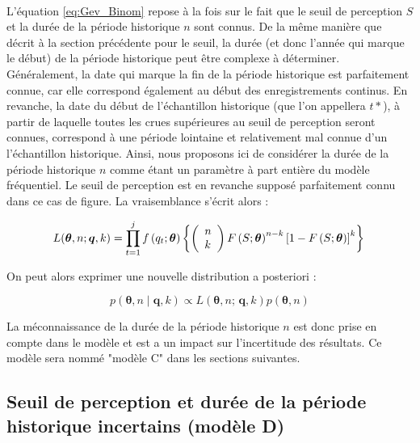 \documentclass[11pt]{article}
\begin{document}
		\paragraph{}
		L'équation \ref{eq:Gev_Binom} repose à la fois sur le fait que le seuil de perception $S$ et la durée de la période historique $n$ sont connus. De la même manière que décrit à la section précédente pour le seuil, la durée (et donc l'année qui marque le début) de la période historique peut être complexe à déterminer. Généralement, la date qui marque la fin de la période historique est parfaitement connue, car elle correspond également au début des enregistrements continus. En revanche, la date du début de l'échantillon historique (que l'on appellera $t*$), à partir de laquelle toutes les crues supérieures au seuil de perception seront connues, correspond à une période lointaine et relativement mal connue d'un l'échantillon historique. Ainsi, nous proposons ici de considérer la durée de la période historique $n$ comme étant un paramètre à part entière du modèle fréquentiel. Le seuil de perception est en revanche supposé parfaitement connu dans ce cas de figure. La vraisemblance s'écrit alors : 
		 
				\begin{equation}
				L(\boldsymbol{\theta}, n ; \boldsymbol{q}, k) = \prod_{t=1}^j f\left(q_t;\boldsymbol{\theta}\right) \left\{\left(\begin{array}{l}
				n \\
				k
				\end{array}\right) F\left(S;\boldsymbol{\theta}\right)^{n-k}\left[1-F\left(S;\boldsymbol{\theta}\right)\right]^k\right\} \\
				\label{eq:Gev_Binom_uN}
				\end{equation}
				
		On peut alors exprimer une nouvelle distribution a posteriori :
		
				\begin{equation}
					p(\boldsymbol{\theta}, n \mid \boldsymbol{q},k) \propto L(\boldsymbol{\theta},n;\,\boldsymbol{q},k) p(\boldsymbol{\theta},n)
					\label{eq:Bayes_uN}
				\end{equation}
			
		La méconnaissance de la durée de la période historique $n$ est donc prise en compte dans le modèle et est a un impact sur l'incertitude des résultats. Ce modèle sera nommé "modèle C" dans les sections suivantes. 
	
	\subsection{Seuil de perception et durée de la période historique incertains (modèle D)}
	\label{subsec:modD}	
	
\end{document}
